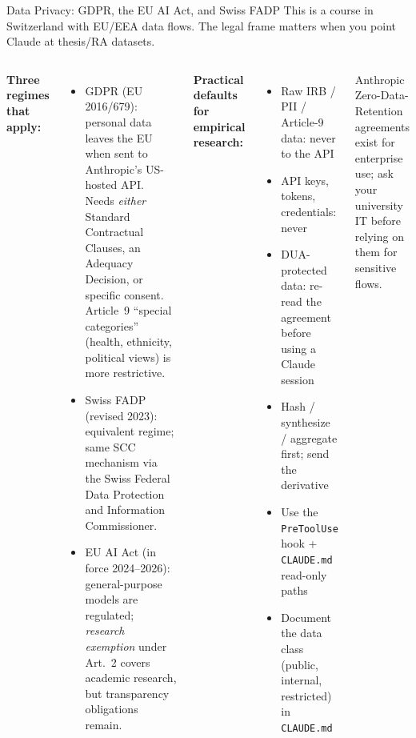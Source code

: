 \documentclass[aspectratio=169,10pt]{beamer}
\newcommand{\emphc}[1]{\textcolor{harvardcrimson}{#1}}
\begin{document}
\begin{frame}{Data Privacy: GDPR, the EU AI Act, and Swiss FADP}
\small
This is a course in Switzerland with EU/EEA data flows. The legal frame
matters when you point Claude at thesis/RA datasets.

\vspace{0.3em}
\begin{columns}[T]
\textbf{Three regimes that apply:}
\begin{itemize}\itemsep1pt
    \item \emphc{GDPR} (EU 2016/679): personal data leaves the EU when sent to Anthropic's US-hosted API. Needs \emph{either} Standard Contractual Clauses, an Adequacy Decision, or specific consent. Article~9 ``special categories'' (health, ethnicity, political views) is more restrictive.
    \item \emphc{Swiss FADP} (revised 2023): equivalent regime; same SCC mechanism via the Swiss Federal Data Protection and Information Commissioner.
    \item \emphc{EU AI Act} (in force 2024--2026): general-purpose models are regulated; \emph{research exemption} under Art.~2 covers academic research, but transparency obligations remain.
\end{itemize}

\textbf{Practical defaults for empirical research:}
\begin{itemize}\itemsep0pt
    \item[\textcolor{darkred}{\ding{55}}] Raw IRB / PII / Article-9 data: never to the API
    \item[\textcolor{darkred}{\ding{55}}] API keys, tokens, credentials: never
    \item[\textcolor{softorange}{\textbf{?}}] DUA-protected data: re-read the agreement before using a Claude session
    \item[\textcolor{darkgreen}{\checkmark}] Hash / synthesize / aggregate first; send the derivative
    \item[\textcolor{darkgreen}{\checkmark}] Use the \texttt{PreToolUse} hook + \texttt{CLAUDE.md} read-only paths
    \item[\textcolor{darkgreen}{\checkmark}] Document the data class (public, internal, restricted) in \texttt{CLAUDE.md}
\end{itemize}

\vspace{0.3em}
{\tiny Anthropic Zero-Data-Retention agreements exist for enterprise use;
ask your university IT before relying on them for sensitive flows.}
\end{columns}
\end{frame}
\end{document}
